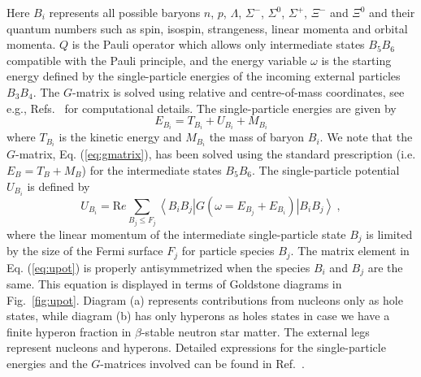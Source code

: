 Here $B_i$ represents all possible baryons $n$, $p$, $\Lambda$, $\Sigma^{-}$,
$\Sigma^0$, $\Sigma^+$, $\Xi^-$ and $\Xi^0$ and their quantum numbers
such as spin, isospin, strangeness, linear momenta and orbital momenta.
$Q$ is the Pauli operator which allows only intermediate states $B_5B_6$ 
compatible with the Pauli principle, and the energy variable $\omega$ is 
the starting 
energy
defined by the single-particle energies
of the incoming external particles $B_3B_4$.
The $G$-matrix is solved using relative and centre-of-mass coordinates,
see e.g., Refs.~\cite{isaac99,sl99} for computational details.
The single-particle energies are given by
\begin{equation}
      E_{B_i}=T_{B_i} + U_{B_i} +M_{B_i}
       \label{eq:spenergy}
\end{equation}
where $T_{B_i}$ is the kinetic energy and $M_{B_i}$
the mass of baryon ${B_i}$. 
We note that the $G$-matrix, Eq. (\ref{eq:gmatrix}), has been solved
using 
the standard prescription (i.e. $E_{B}=T_B+M_B$)
for the
intermediate states $B_5B_6$.
The single-particle potential $U_{B_i}$ is defined by 
\begin{equation}
       U_{B_i}={\mathrm Re} \sum_{B_j\leq F_j}
       \left\langle B_iB_j\right |
       G(\omega=E_{B_j}+E_{B_i})
       \left | B_iB_j \right\rangle \ ,
\label{eq:upot}
\end{equation}
where the linear momentum of the intermediate
single-particle state $B_j$ is limited by the size of the Fermi surface
$F_j$ for particle species $B_j$. The matrix element in Eq.
(\ref{eq:upot}) is
properly 
antisymmetrized
when the species $B_i$ and $B_j$ are the same.
This equation is displayed in terms of Goldstone diagrams
in Fig.\ \ref{fig:upot}. Diagram (a) represents contributions
from nucleons only as hole states, while diagram (b)
has only hyperons as holes states in case we have a finite hyperon
fraction in $\beta$-stable neutron star matter. The external legs
represent nucleons and hyperons. 
Detailed expressions for the single-particle energies and the $G$-matrices
involved can be found in Ref.\ \cite{isaac99}. 

